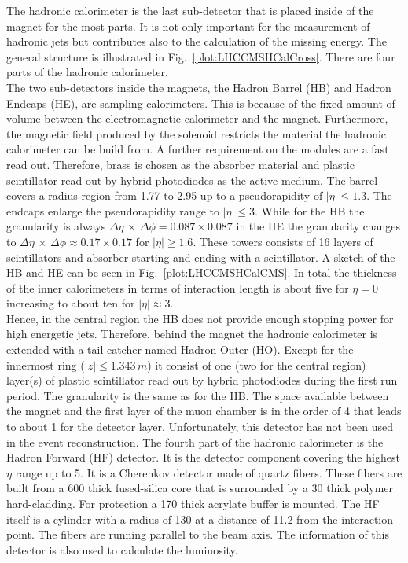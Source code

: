 The hadronic calorimeter is the last sub-detector that is placed inside of the magnet for the most parts. It is not only important for the measurement of hadronic jets but contributes also to the calculation of the missing energy. The general structure is illustrated in Fig.~\ref{plot:LHCCMSHCalCross}. There are four parts of the hadronic calorimeter.\\
The two sub-detectors inside the magnets, the Hadron Barrel (HB) and Hadron Endcaps (HE), are sampling calorimeters. This is because of the fixed amount of volume between the electromagnetic calorimeter and the magnet. Furthermore, the magnetic field produced by the solenoid restricts the material the hadronic calorimeter can be build from. A further requirement on the modules are a fast read out. Therefore, brass is chosen as the absorber material and plastic scintillator read out by hybrid photodiodes as the active medium. The barrel covers a radius region from 1.77 to 2.95\m{} up to a pseudorapidity of $\left|\eta{}\right| \leq{} 1.3$. The endcaps enlarge the pseudorapidity range to $\left|\eta{}\right| \leq{} 3$. While for the HB the granularity is always $\Delta{}\eta\,\times\,\Delta{}\phi{} = 0.087 \times{} 0.087$ in the HE the granularity changes to $\Delta{}\eta\,\times\,\Delta{}\phi{} \approx 0.17 \times{} 0.17$ for $\left|\eta{}\right| \geq{} 1.6$. These towers consists of 16 layers of scintillators and absorber starting and ending with a scintillator. A sketch of the HB and HE can be seen in Fig.~\ref{plot:LHCCMSHCalCMS}. In total the thickness of the inner calorimeters in terms of interaction length is about five for $\eta{}=0$ increasing to about ten for $\left|\eta{}\right|\approx{}3$.\\
Hence, in the central region the HB does not provide enough stopping power for high energetic jets. Therefore, behind the magnet the hadronic calorimeter is extended with a tail catcher named Hadron Outer (HO). Except for the innermost ring ($\left|z\right| \leq{} 1.343\,m$) it consist of one (two for the central region) layer(s) of plastic scintillator read out by hybrid photodiodes during the first run period. The granularity is the same as for the HB. The space available between the magnet and the first layer of the muon chamber is in the order of 4\cm{} that leads to about 1\cm{} for the detector layer. Unfortunately, this detector has not been used in the event reconstruction.
The fourth part of the hadronic calorimeter is the Hadron Forward (HF) detector. It is the detector component  covering the  highest $\eta{}$ range up to 5. It is a Cherenkov detector made of quartz fibers. These fibers are built from a 600\mum{} thick fused-silica core that is surrounded by a 30\mum{} thick polymer hard-cladding. For protection a 170\mum{} thick acrylate buffer is mounted. The HF itself is a cylinder with a radius of 130\cm{} at a distance of 11.2\m{} from the interaction point. The fibers are running parallel to the beam axis. The information of this detector is also used to calculate the luminosity.

